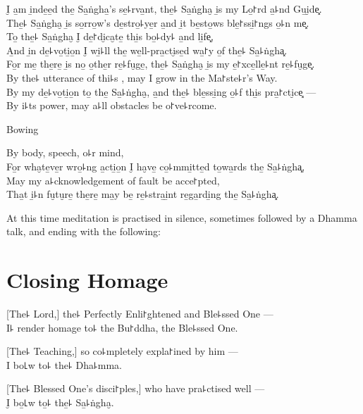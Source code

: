 \clearpage

I̮ a̱m i̱nde̱e̱d the̱ Sa̱ṅgha̱'s se̱꜕rva̱nt, the̱꜕ Sa̱ṅgha̮ i̱s my Lo̱꜓rd a̱꜕nd Gu̱i̮de͓.\\
The̱꜕ Sa̱ṅgha̮ i̱s so̱rro̱w's de̱stro̱꜕ye̱r a̱nd i̱t be̱sto̱ws ble̱꜓ssi̱꜓ngs o̱꜕n me͓.\\
To̱ the̱꜕ Sa̱ṅgha̮ I̮ de̱꜓di̮ca̮te̱ thi̱s bo̱꜕dy꜕ a̱nd li̱fe͓,\\
A̱nd i̱n de̱꜕vo̱ti̱o̱n I̮ wi̱꜕ll  the̱ we̱ll-pra̱cti̮se̱d wa̱꜓y o̱f the̱꜕ Sa̱꜕ṅgha͓.\\
Fo̱r me̱ the̱re̱ i̱s no̱ o̱the̱r re̱꜕fu̮ge̱, the̱꜕ Sa̱ṅgha̮ i̱s my e̱꜓xce̱lle̱꜕nt re̱꜕fu̮ge͓.\\
By the꜕ utterance of thi꜕s , may I grow in the Ma꜓ste꜕r's Way.\\
By my de̱꜕vo̱ti̱o̱n to̱ the̱ Sa̱꜕ṅgha̮, a̱nd the̱꜕ ble̱ssi̱ng o̱꜕f thi̱s pra̱꜓cti̮ce͓ ---\\
By i꜕ts power, may a꜕ll obstacles be o꜓ve꜕rcome.

\begin{instruction}
  Bowing
\end{instruction}

By body, speech, o꜕r mind,\\
Fo̱r wha̮te̱ve̱r wro̱꜕ng a̱cti̱o̱n I̮ ha̮ve̱ co̱꜕mmi̱tte̱d to̱wa̱rds the̱ Sa̱꜕ṅgha͓,\\
May my a꜕cknowledgement of fault be acce꜓pted,\\
Tha̱t i̱꜕n fu̮tu̮re̱ the̱re̱ ma̱y be̱ re̱꜕stra̱i̱nt re̱ga̱rdi̱ng the̱ Sa̱꜕ṅgha͓.

\vfill

\begin{instruction}
  At this time meditation is practised in silence, sometimes followed by a Dhamma talk, and ending with the following:
\end{instruction}

\chapter{Closing Homage}

[The꜕ Lord,] the꜕ Perfectly Enli꜓ghtened and Ble꜕ssed One ---\\
I꜕ render homage to꜕ the Bu꜓ddha, the Ble꜕ssed One. 

[The꜕ Teaching,] so co꜕mpletely expla꜓ined by him ---\\
I bo꜖w to꜕ the꜕ Dha꜕mma. 

[The꜕ Blessed One's disci꜓ples,] who have pra꜕ctised well ---\\
I̮ bo̱꜖w to̱꜕ the̱꜕ Sa̱꜕ṅgha̮. 


